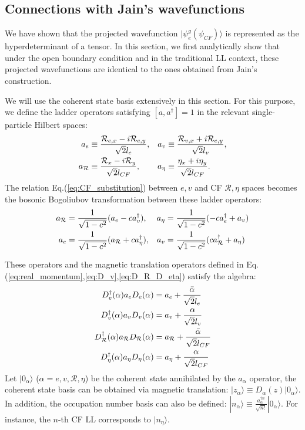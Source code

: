 \subsection{Connections with Jain's wavefunctions}\label{sec:connection_jain}
We have shown that the projected wavefunction $|\psi^g_e(\psi_{CF})\rangle$ is represented as the hyperdeterminant of a tensor. In this section, we first analytically show that under the open boundary condition and in the traditional LL context, these projected wavefunctions are identical to the ones obtained from Jain's construction. 

We will use the coherent state basis extensively in this section. For this purpose, we define the ladder operators satisfying $[a,a^\dagger]=1$ in the relevant single-particle Hilbert spaces:
\begin{align}
a_e&\equiv\frac{\mathcal R_{e,x}-i\mathcal R_{e,y}}{\sqrt{2} l_e}, &a_v&\equiv\frac{\mathcal R_{v,x}+i\mathcal R_{e,y}}{\sqrt{2} l_v},\notag\\
a_{\mathcal R}&\equiv\frac{\mathcal R_x-i\mathcal R_y}{\sqrt{2} l_{CF}}, &a_{\eta}&\equiv\frac{\mathcal \eta_{x}+i\eta_{y}}{\sqrt{2} l_{CF}}.\label{eq:ladder_op}
\end{align}
The relation Eq.(\ref{eq:CF_substitution}) between $e,v$ and CF $\mathcal R,\eta$ spaces becomes the bosonic Bogoliubov transformation between these ladder operators:
\begin{align}
a_{\mathcal R}&=\frac{1}{\sqrt{1-c^2}}(a_e-c a_v^\dagger),&a_{\eta}&=\frac{1}{\sqrt{1-c^2}}(-c a_e^\dagger+a_v)\notag\\
a_e&=\frac{1}{\sqrt{1-c^2}}(a_{\mathcal R}+c a_{\eta}^\dagger),&a_v&=\frac{1}{\sqrt{1-c^2}}(c a_{\mathcal R}^\dagger+a_{\eta})\label{eq:a_bogoliubov}
\end{align}


These operators and the magnetic translation operators defined in Eq.(\ref{eq:real_momentum},\ref{eq:D_v},\ref{eq:D_R_D_eta}) satisfy the algebra:
\begin{align}
D^\dagger_e(\alpha) a_e D_e(\alpha) &= a_e + \frac{\bar \alpha}{\sqrt{2}l_e}\notag\\
D^\dagger_v(\alpha) a_v D_v(\alpha) &= a_v + \frac{ \alpha}{\sqrt{2}l_v}\notag\\
D^\dagger_{\mathcal R}(\alpha) a_{\mathcal R} D_{\mathcal R}(\alpha) &= a_{\mathcal R} + \frac{\bar \alpha}{\sqrt{2}l_{CF}}\notag\\
D^\dagger_{\eta}(\alpha) a_{\eta} D_{\eta}(\alpha) &= a_{\eta} + \frac{ \alpha}{\sqrt{2}l_{CF}}
\end{align}
Let $|0_\alpha\rangle$ ($\alpha=e,v,\mathcal R,\eta$) be the coherent state annihilated by the $a_\alpha$ operator, the coherent state basis can be obtained via magnetic translation: $|z_\alpha\rangle\equiv D_\alpha(z)|0_\alpha\rangle$. In addition, the occupation number basis can also be defined: $|n_{\alpha}\rangle\equiv\frac{a^{\dagger n}_{\alpha}}{\sqrt{n!}}|0_{\alpha}\rangle$. For instance, the $n$-th CF LL corresponds to $|n_{\eta}\rangle$.

